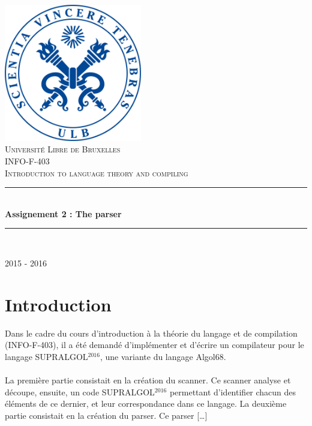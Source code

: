 \documentclass[pdftex,10pt,a4paper]{article} \usepackage[utf8]{inputenc}
\newcommand{\HRule}{\rule{\linewidth}{0.5mm}}
\begin{document}
\begin{titlepage}
\begin{center}

\includegraphics[width=0.45\textwidth]{./sceau-a-quadri.jpg}\\[1cm]

\textsc{\LARGE Université Libre de Bruxelles}\\[1.5cm]
\textsc{\Large INFO-F-403\\ Introduction to language theory and compiling}\\[1.5cm]

\HRule \\[0.4cm]
{ \huge \bfseries Assignement 2 : The parser\\[0.4cm] }

\HRule \\[1.5cm]


\vfill
{\large 2015 - 2016}

\end{center}
\end{titlepage}

\newpage

\section{Introduction}

Dans le cadre du cours d'introduction à la théorie du langage et de compilation (INFO-F-403), il a été demandé d'implémenter et d'écrire un compilateur pour le langage SUPRALGOL$^{2016}$, une variante du langage Algol68.\\\\ 

La première partie consistait en la création du scanner. Ce scanner analyse et découpe, ensuite, un code SUPRALGOL$^{2016}$ permettant d'identifier chacun des éléments de ce dernier, et leur correspondance dans ce langage.
La deuxième partie consistait en la création du parser. Ce parser [\ldots]\\\\
\end{document}
